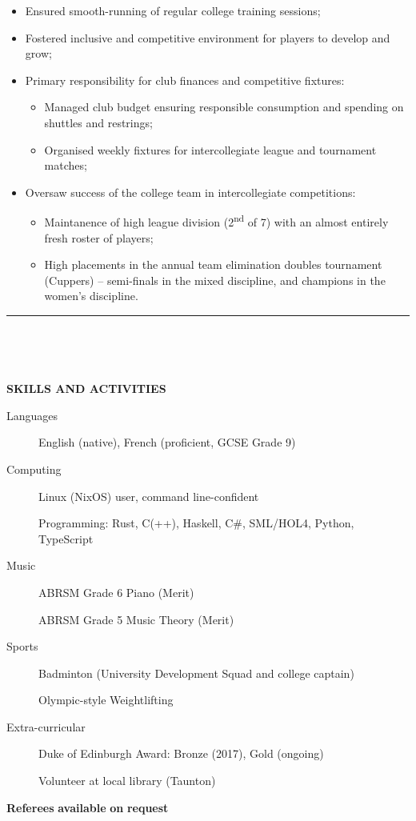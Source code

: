 \documentclass[
  11pt,
  a4paper,
]{article}
\providecommand{\tightlist}{%
  \setlength{\itemsep}{0pt}\setlength{\parskip}{0pt}}
\newcommand{\itemspace}{0.8ex}
\newcommand{\ruledheader}[2]{%
\begingroup
\setlength{\fboxsep}{0pt}%
\colorbox{#1}{%
\parbox[b][1.2ex][t]{35mm}{\begin{tiny}\ \end{tiny}}}%
\parbox[b][1.2ex][t]{5mm}{\begin{tiny}\ \end{tiny}}%
\uppercase{\textbf{#2}}
\endgroup}
\begin{document}
\begin{itemize}
\tightlist
\item
  Ensured smooth-running of regular college training sessions;
\item
  Fostered inclusive and competitive environment for players to develop
  and grow;
\item
  Primary responsibility for club finances and competitive fixtures:

  \begin{itemize}
  \tightlist
  \item
    Managed club budget ensuring responsible consumption and spending on
    shuttles and restrings;
  \item
    Organised weekly fixtures for intercollegiate league and tournament
    matches;
  \end{itemize}
\item
  Oversaw success of the college team in intercollegiate competitions:

  \begin{itemize}
  \tightlist
  \item
    Maintanence of high league division (2\textsuperscript{nd} of 7)
    with an almost entirely fresh roster of players;
  \item
    High placements in the annual team elimination doubles tournament
    (Cuppers) – semi-finals in the mixed discipline, and champions in
    the women’s discipline.
  \end{itemize}
\end{itemize}

\begin{Large}

\vspace{-1.5ex}\rule{\textwidth}{0.8pt}\vspace{2ex}

\ruledheader{cyan!50!teal}{Skills and activities}\end{Large}

\vspace{\itemspace}

\begin{description}
\item[Languages]
English (native), French (proficient, GCSE Grade 9)
\item[Computing]
Linux (NixOS) user, command line-confident

Programming: Rust, C(++), Haskell, C\#, SML/HOL4, Python, TypeScript
\item[Music]
ABRSM Grade 6 Piano (Merit)

ABRSM Grade 5 Music Theory (Merit)
\item[Sports]
Badminton (University Development Squad and college captain)

Olympic-style Weightlifting
\item[Extra-curricular]
Duke of Edinburgh Award: Bronze (2017), Gold (ongoing)

Volunteer at local library (Taunton)
\end{description}

\vspace{2.0ex}\begin{center}

\textbf{Referees} \textbf{available} \textbf{on} \textbf{request}

\end{center}
\end{document}
